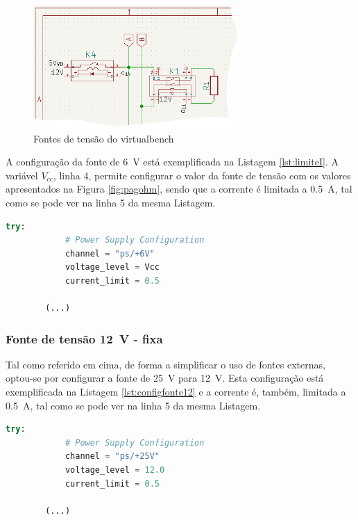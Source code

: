 \begin{figure}[hbtp]
	\centering
	\includegraphics[width=0.7\textwidth]{figures/sch_fonte5VB.png}
	\caption{Fontes de tensão do \acrshort{virtualbench}}
	\label{fig:schfonte5VB}
\end{figure}

A configuração da fonte de \SI{6}{\volt} está exemplificada na Listagem \ref{lst:limiteI}. A variável $V_{cc}$, linha 4,  permite configurar o valor da fonte de tensão com os valores apresentados na Figura \ref{fig:pagohm}, sendo que a corrente é limitada a \SI{0.5}{\ampere}, tal como se pode ver na linha 5 da mesma Listagem.

\begin{minipage}{0.9\linewidth}
	\centering
	\begin{lstlisting}[language=Python, caption=Configuração da fonte de \SI{6}{\volt}, label=lst:limiteI]
		try:
			# Power Supply Configuration
			channel = "ps/+6V"
			voltage_level = Vcc
			current_limit = 0.5

		(...)
	\end{lstlisting}
\end{minipage}

\subsubsection{Fonte de tensão \SI{12}{\volt} - fixa}
Tal como referido em cima, de forma a simplificar o uso de fontes externas, optou-se por configurar a fonte de \SI{25}{\volt} para \SI{12}{\volt}. Esta configuração está exemplificada na Listagem \ref{lst:configfonte12} e a corrente é, também, limitada a \SI{0.5}{\ampere}, tal como se pode ver na linha 5 da mesma Listagem.

\begin{minipage}{0.9\linewidth}
	\begin{lstlisting}[language=Python, caption=Configuração da fonte de \SI{12}{\volt}, label=lst:configfonte12]
		try:
			# Power Supply Configuration
			channel = "ps/+25V"
			voltage_level = 12.0
			current_limit = 0.5

		(...)
	\end{lstlisting}
\end{minipage}

